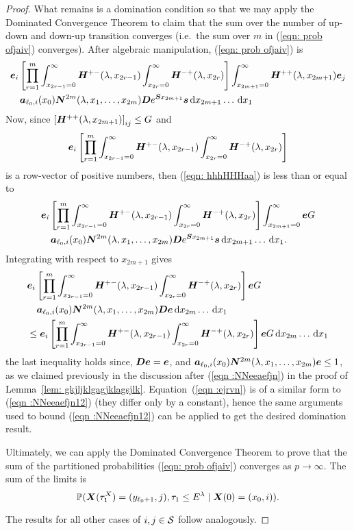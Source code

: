 \begin{proof}
	What remains is a domination condition so that we may apply the Dominated Convergence Theorem to claim that the sum over the number of up-down and down-up transition converges (i.e.~the sum over \(m\) in (\ref{eqn: prob ofjaiv}) converges). After algebraic manipulation, (\ref{eqn: prob ofjaiv}) is 
	\begin{align}
			&\boldsymbol e_i \left[\prod_{r=1}^m\int_{x_{2r-1}=0}^\infty \boldsymbol H^{+-}(\lambda,x_{2r-1})\nonumber
			\int_{x_{2r}=0}^\infty \boldsymbol H^{-+}(\lambda,x_{2r}) \right]
			\int_{x_{2m+1}=0}^\infty \boldsymbol H^{++}(\lambda,x_{2m+1}) \boldsymbol e_j
		\\&\quad\boldsymbol a_{\ell_0,i}(x_0) \boldsymbol N^{2m}(\lambda,x_1,\dots,x_{2m})\boldsymbol De^{\boldsymbol Sx_{2m+1}} {\boldsymbol s} \, \mathrm{d} x_{2m+1} \dots \, \mathrm{d} x_1 \label{eqn: hhhHHHaa}  
	\end{align}
	Now, since \(\left[\boldsymbol H^{++}(\lambda,x_{2m+1})\right]_{ij}\leq G\) and  
	\[\boldsymbol e_i \left[\prod_{r=1}^m\int_{x_{2r-1}=0}^\infty \boldsymbol H^{+-}(\lambda,x_{2r-1})\nonumber
	\int_{x_{2r}=0}^\infty \boldsymbol H^{-+}(\lambda,x_{2r}) \right]\] 
	is a row-vector of positive numbers, then (\ref{eqn: hhhHHHaa}) is less than or equal to 
	\begin{align}
		&\boldsymbol e_i \left[\prod_{r=1}^m\int_{x_{2r-1}=0}^\infty \boldsymbol H^{+-}(\lambda,x_{2r-1})\nonumber
		\int_{x_{2r}=0}^\infty \boldsymbol H^{-+}(\lambda,x_{2r}) \right]
		\int_{x_{2m+1}=0}^\infty  \boldsymbol e G
		\\&\quad\boldsymbol a_{\ell_0,i}(x_0) \boldsymbol N^{2m}(\lambda,x_1,\dots,x_{2m})\boldsymbol De^{\boldsymbol Sx_{2m+1}}{\boldsymbol s} \, \mathrm{d} x_{2m+1}\dots \, \mathrm{d} x_1.\nonumber
	\end{align}
	Integrating with respect to \(x_{2m+1}\) gives
	\begin{align}
		&\boldsymbol e_i \left[\prod_{r=1}^m\int_{x_{2r-1}=0}^\infty \boldsymbol H^{+-}(\lambda,x_{2r-1})\nonumber
		\int_{x_{2r}=0}^\infty \boldsymbol H^{-+}(\lambda,x_{2r}) \right]
		 \boldsymbol e G
		\\&\quad\boldsymbol a_{\ell_0,i}(x_0) \boldsymbol N^{2m}(\lambda,x_1,\dots,x_{2m})\boldsymbol D {\boldsymbol e}\, \mathrm{d} x_{2m} \dots \, \mathrm{d} x_1\nonumber
		\\&\leq\boldsymbol e_i \left[\prod_{r=1}^m\int_{x_{2r-1}=0}^\infty \boldsymbol H^{+-}(\lambda,x_{2r-1})
		\int_{x_{2r}=0}^\infty \boldsymbol H^{-+}(\lambda,x_{2r}) \right]
		 \boldsymbol e G \, \mathrm{d} x_{2m}\dots \, \mathrm{d} x_1 \label{eqn :ejrvn}
	\end{align}
	the last inequality holds since, \(\boldsymbol D{\boldsymbol e}=\boldsymbol e\), and \(\boldsymbol a_{\ell_0,i}(x_0) \boldsymbol N^{2m}(\lambda,x_1,\dots,x_{2m}){\boldsymbol e}\leq 1\), as we claimed previously in the discussion after (\ref{eqn :NNeeaefjn}) in the proof of Lemma~\ref{lem: gkjljklgagjklagsjlk}. Equation~(\ref{eqn :ejrvn}) is of a similar form to (\ref{eqn :NNeeaefjn12}) (they differ only by a constant), hence the same arguments used to bound (\ref{eqn :NNeeaefjn12}) can be applied to get the desired domination result. 
	
	Ultimately, we can apply the Dominated Convergence Theorem to prove that the sum of the partitioned probabilities (\ref{eqn: prob ofjaiv}) converges as \(p\to\infty\). The sum of the limits is 
	\[\mathbb P(\boldsymbol X(\tau_1^X) = (y_{\ell_0+1}, j), \tau_{1}\leq E^\lambda 
            	 \mid \boldsymbol X(0) = (x_0,i)).\]
	 
	 The results for all other cases of \(i,j\in\mathcal{S}\) follow analogously.
\end{proof}